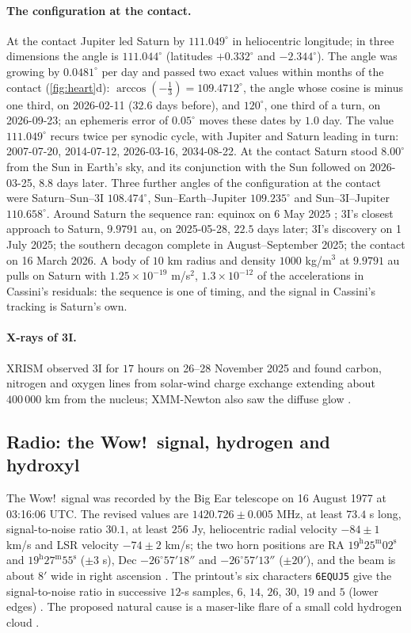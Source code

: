 \documentclass[11pt]{article}
\theoremstyle{definition}\newtheorem{definition}[theorem]{Definition}
\theoremstyle{remark}\newtheorem{remark}[theorem]{Remark}
\begin{document}
\paragraph{The configuration at the contact.} At the contact Jupiter led Saturn by $111.049^\circ$ in heliocentric longitude; in three dimensions the angle is $111.044^\circ$ (latitudes $+0.332^\circ$ and $-2.344^\circ$). The angle was growing by $0.0481^\circ$ per day and passed two exact values within months of the contact (\cref{fig:heart}d): $\arccos(-\frac13)=109.4712^\circ$, the angle whose cosine is minus one third, on 2026-02-11 ($32.6$ days before), and $120^\circ$, one third of a turn, on 2026-09-23; an ephemeris error of $0.05^\circ$ moves these dates by $1.0$ day. The value $111.049^\circ$ recurs twice per synodic cycle, with Jupiter and Saturn leading in turn: 2007-07-20, 2014-07-12, 2026-03-16, 2034-08-22. At the contact Saturn stood $8.00^\circ$ from the Sun in Earth's sky, and its conjunction with the Sun followed on 2026-03-25, $8.8$ days later. Three further angles of the configuration at the contact were Saturn--Sun--3I $108.474^\circ$, Sun--Earth--Jupiter $109.235^\circ$ and Sun--3I--Jupiter $110.658^\circ$. Around Saturn the sequence ran: equinox on 6 May 2025 \cite{AAQ}; 3I's closest approach to Saturn, $9.9791$ au, on 2025-05-28, $22.5$ days later; 3I's discovery on 1 July 2025; the southern decagon complete in August--September 2025; the contact on 16 March 2026. A body of $10$ km radius and density $1000$ kg/m$^3$ at $9.9791$ au pulls on Saturn with $1.25\times10^{-19}$ m/s$^2$, $1.3\times10^{-12}$ of the accelerations in Cassini's residuals: the sequence is one of timing, and the signal in Cassini's tracking is Saturn's own.

\paragraph{X-rays of 3I.} XRISM observed 3I for $17$ hours on 26--28 November 2025 and found carbon, nitrogen and oxygen lines from solar-wind charge exchange extending about $400\,000$ km from the nucleus; XMM-Newton also saw the diffuse glow \cite{ESAXRISM}.

\subsection{Radio: the Wow!\ signal, hydrogen and hydroxyl}\label{sec:radio}
The Wow!\ signal was recorded by the Big Ear telescope on 16 August 1977 at 03:16:06 UTC. The revised values are $1420.726\pm0.005$ MHz, at least $73.4$ s long, signal-to-noise ratio $30.1$, at least $256$ Jy, heliocentric radial velocity $-84\pm1$ km/s and LSR velocity $-74\pm2$ km/s; the two horn positions are RA $19^\mathrm{h}25^\mathrm{m}02^\mathrm{s}$ and $19^\mathrm{h}27^\mathrm{m}55^\mathrm{s}$ ($\pm3$ s), Dec $-26^\circ57'18''$ and $-26^\circ57'13''$ ($\pm20'$), and the beam is about $8'$ wide in right ascension \cite{Mendez25}. The printout's six characters \texttt{6EQUJ5} give the signal-to-noise ratio in successive $12$-s samples, $6$, $14$, $26$, $30$, $19$ and $5$ (lower edges) \cite{Ehman}. The proposed natural cause is a maser-like flare of a small cold hydrogen cloud \cite{Mendez24}.
\end{document}
